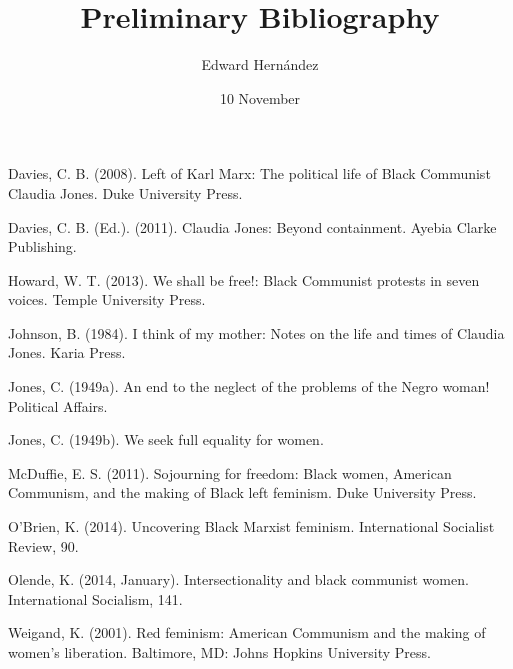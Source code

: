 \documentclass[doc,12pt]{apa6}
\begin{document}
\title{Preliminary Bibliography}
\author{Edward Hern\'{a}ndez}
\date{10 November}
\maketitle


\noindent
Davies, C. B. (2008). Left of Karl Marx: The political life of Black Communist Claudia Jones. Duke University Press.
\nocite{Davies08}

\noindent
Davies, C. B. (Ed.). (2011). Claudia Jones: Beyond containment. Ayebia Clarke Publishing.
\nocite{Davies11}

\noindent
Howard, W. T. (2013). We shall be free!: Black Communist protests in seven voices. Temple University Press.
\nocite{Howard13}

\noindent
Johnson, B. (1984). I think of my mother: Notes on the life and times of Claudia Jones. Karia Press.
\nocite{Johnson84}

\noindent
Jones, C. (1949a). An end to the neglect of the problems of the Negro woman! Political Affairs.
\nocite{Jones49a}

\noindent
Jones, C. (1949b). We seek full equality for women.
\nocite{Jones49b}

\noindent
McDuffie, E. S. (2011). Sojourning for freedom: Black women, American Communism, and the making of Black left feminism. Duke University Press.
\nocite{McDuffie11}

\noindent
O’Brien, K. (2014). Uncovering Black Marxist feminism. International Socialist Review, 90.
\nocite{OBrien14}

\noindent
Olende, K. (2014, January). Intersectionality and black communist women. International Socialism, 141.
\nocite{Olende14}

\noindent
Weigand, K. (2001). Red feminism: American Communism and the making of women’s liberation. Baltimore, MD: Johns Hopkins University Press.
\nocite{Weigand01}


% 
% 
\end{document}
